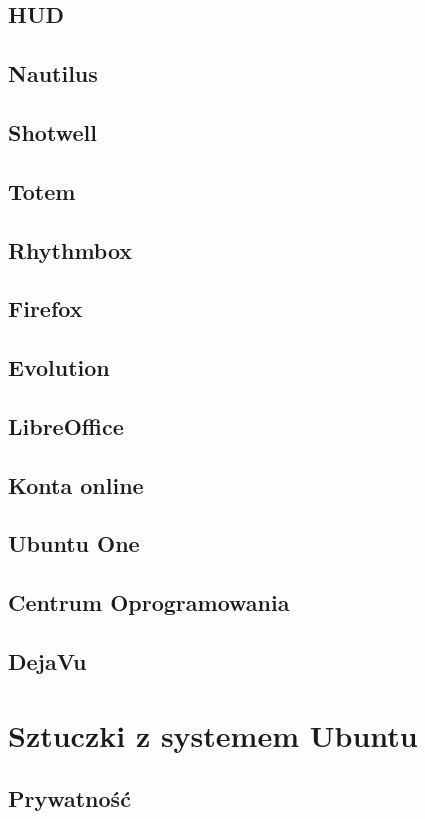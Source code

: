 \documentclass[a4paper,11pt,oneside]{mwart}
\begin{document}
        \subsection{HUD}
        \subsection{Nautilus}
        \subsection{Shotwell}
        \subsection{Totem}
        \subsection{Rhythmbox}
        \subsection{Firefox}
        \subsection{Evolution}
        \subsection{LibreOffice}
        \subsection{Konta online}
        \subsection{Ubuntu One}
        \subsection{Centrum Oprogramowania}
        \subsection{DejaVu}
\section{Sztuczki z systemem Ubuntu}
        \subsection{Prywatność}
\end{document}
